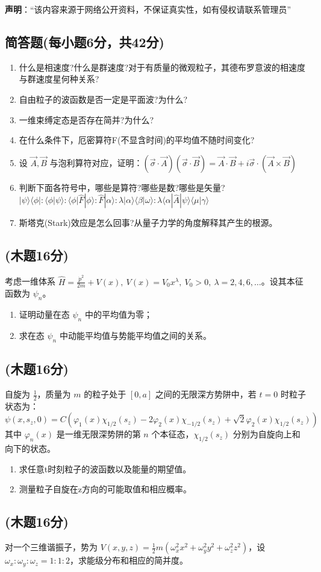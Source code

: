 
\textbf{声明}：“该内容来源于网络公开资料，不保证真实性，如有侵权请联系管理员”

\subsection{简答题(每小题6分，共42分)}
\begin{enumerate}
\item 什么是相速度?什么是群速度?对于有质量的微观粒子，其德布罗意波的相速度与群速度星何种关系?
\item 自由粒子的波函数是否一定是平面波?为什么?
\item 一维束缚定态是否存在简并?为什么?
\item 在什么条件下，厄密算符F(不显含时间)的平均值不随时间变化?
\item 设 $\vec{A}, \vec{B}$ 与泡利算符对应，证明：$\left( \vec{\sigma} \cdot \vec{A} \right) \left( \vec{\sigma} \cdot \vec{B} \right) = \vec{A} \cdot \vec{B} + i \vec{\sigma} \cdot \left( \vec{A} \times \vec{B} \right)$
\item 判断下面各符号中，哪些是算符?哪些是数?哪些是矢量?
$|\psi\rangle\langle\phi| : \langle\phi|\psi\rangle : \langle\phi|\hat{F}|\phi\rangle : \hat{F}|\alpha\rangle : \lambda |\alpha\rangle\langle\beta|\omega\rangle : \lambda \langle\alpha|\hat{A}|\psi\rangle\langle\mu|\gamma\rangle$
\item 斯塔克(Stark)效应是怎么回事?从量子力学的角度解释其产生的根源。
\end{enumerate}
\subsection{(木题16分)}
考虑一维体系 $\hat H = \frac{\dot p^2}{2m} + V(x),\ V(x) = V_0 x^\lambda,\ V_0 > 0,\ \lambda = 2, 4, 6, \ldots$。设其本征函数为 $\psi_n$。
\begin{enumerate}
\item 证明动量在态 $\psi_n$ 中的平均值为零；
\item 求在态 $\psi_n$ 中动能平均值与势能平均值之间的关系。
\end{enumerate}
\subsection{(木题16分)}
自旋为 $\frac{1}{2}$，质量为 $m$ 的粒子处于 $[0,a]$ 之间的无限深方势阱中，若 $t = 0$ 时粒子状态为：
$$\psi(x,s_z,0) = C \left( \varphi_1(x) \chi_{1/2}(s_z) - 2 \varphi_2(x) \chi_{-1/2}(s_z) + \sqrt{2} \varphi_2(x) \chi_{1/2}(s_z) \right)~$$
其中 $\varphi_n(x)$ 是一维无限深势阱的第 $n$ 个本征态，$\chi_{1/2}(s_z)$ 分别为自旋向上和向下的状态。
\begin{enumerate}
\item 求任意t时刻粒子的波函数以及能量的期望值。
\item 测量粒子自旋在z方向的可能取值和相应概率。
\end{enumerate}
\subsection{(木题16分)}
对一个三维谐振子，势为 $V(x, y, z) = \frac{1}{2}m \left( \omega_x^2 x^2 + \omega_y^2 y^2 + \omega_z^2 z^2 \right)$，设 $\omega_x : \omega_y : \omega_z = 1 : 1 : 2$，求能级分布和相应的简并度。